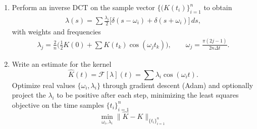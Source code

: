 \documentclass{cams-l} %
\newcommand{\cF}{\mathcal F}
\theoremstyle{definition}
\theoremstyle{remark}
\numberwithin{equation}{section}
\begin{document}
\begin{algorithm}[H]
\DontPrintSemicolon
{}
\begin{enumerate}
\item Perform an inverse DCT on the sample vector $\{(K(t_i)\}_{i=1}^n$ to obtain
\begin{align*}
    \widehat{\lambda}(s) = \sum \frac{\lambda_i}{2}\Big[\delta(s - \omega_i) + \delta(s + \omega_i)\Big]\,ds,
\end{align*}
with weights and frequencies
\begin{align*}
    \lambda_j = \frac{2}{n}\Big(\frac{1}{2}K(0) + \sum K(t_k)\cos(\omega_jt_k)\Big), \qquad \omega_j = \frac{\pi(2j-1)}{2n\Delta t}.
\end{align*}
\item Write an estimate for the kernel
$$\widehat{K}(t) = \cF[\lambda](t) = \sum\lambda_i\cos(\omega_it).$$
Optimize real values $\{\omega_i, \lambda_i\}$ through gradient descent (Adam) and optionally project the $\lambda_i$ to be positive after each step, minimizing the least squares objective on the time samples $\{t_i\}_{i=1}^n$
$$\min_{\omega_i, \lambda_i}\|\widehat{K} - K\|_{\{t_i\}_{i=1}^n}$$
\end{enumerate}
\caption{DCT-Based Inverse Fourier Transform of gPD Kernels}
\label{alg:dct_fft}
\end{algorithm}

\bigskip

\daveend
\end{document}

